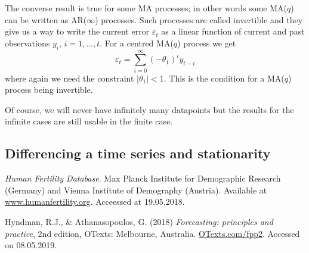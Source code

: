 \documentclass[a4paper, 12pt]{scrartcl}
\begin{document}
The converse result is true for some MA processes; in other words some MA($q$) can be written as AR($\infty$) processes.
Such processes are called invertible and they give us a way to write the current error $\varepsilon_t$ as a linear function of current and past observations $y_i$, $i=1,\dots,t$.
For a centred MA($q$) process we get
\begin{equation*}
	\varepsilon_t=\sum_{i=0}^{\infty}\left(-\theta_1\right)^iy_{t-i}
\end{equation*}
where again we need the constraint $|\theta_1|<1$.
This is the condition for a MA($q$) process being invertible.

Of course, we will never have infinitely many datapoints but the results for the infinite cases are still usable in the finite case.

\subsection{Differencing a time series and stationarity}


\begin{thebibliography}{2}
	 \emph{Human Fertility Database}. Max Planck Institute for Demographic Research (Germany) and Vienna Institute of Demography (Austria). Available at \href{www.humanfertility.org}{www.humanfertility.org}. Acceessed at 19.05.2018.
	
	 Hyndman, R.J., \& Athanasopoulos, G. (2018) \emph{Forecasting: principles and practice}, 2nd edition, OTexts: Melbourne, Australia. \href{https://otexts.com/fpp2/}{OTexts.com/fpp2}. Accessed on 08.05.2019.
\end{thebibliography}
\end{document}
